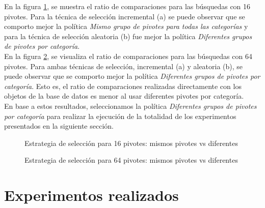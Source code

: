 En la figura \ref{fig:same-vs-diff-16Pivotes}, se muestra el ratio de comparaciones para las b\'usquedas con 16 pivotes. Para la t\'ecnica de selecci\'on incremental (a) se puede observar que se comporto mejor la pol\'itica \textit{Mismo grupo de pivotes para todas las categor\'ias} y para la t\'ecnica de selecci\'on aleatoria (b) fue mejor la pol\'itica \textit{Diferentes grupos de pivotes por categor\'ia}.\\

En la figura \ref{fig:same-vs-diff-64Pivotes}, se visualiza el ratio de comparaciones para las b\'usquedas con 64 pivotes. Para ambas t\'ecnicas de selecci\'on, incremental (a) y aleatoria (b), se puede observar que se comporto mejor la pol\'itica \textit{Diferentes grupos de pivotes por categor\'ia}. Esto es, el ratio de comparaciones realizadas directamente con los objetos de la base de datos es menor al usar diferentes pivotes por categor\'ia.\\

En base a estos resultados, seleccionamos la pol\'itica \textit{Diferentes grupos de pivotes por categor\'ia} para realizar la ejecuci\'on de la totalidad de los experimentos presentados en la siguiente secci\'on.\\

\begin{figure}[tb]
\centering
{}
		\caption{\small Estrategia de selecci\'on para 16 pivotes: mismos pivotes vs diferentes}
		\label{fig:same-vs-diff-16Pivotes}
\end{figure}

\begin{figure}[tb]
\centering
{}
		\caption{\small Estrategia de selecci\'on para 64 pivotes: mismos pivotes vs diferentes}
		\label{fig:same-vs-diff-64Pivotes}
\end{figure}

\section{Experimentos realizados}

